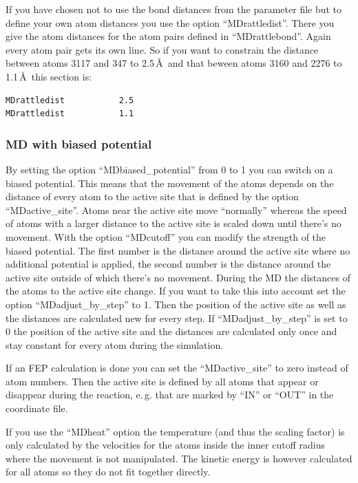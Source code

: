 \documentclass[10pt,a4paper]{article} %
\begin{document}
If you have chosen not to use the bond distances from the parameter file but to define your own atom distances you use the option ``MDrattledist''. There you give the atom distances for the atom pairs defined in ``MDrattlebond''. Again every atom pair gets its own line. So if you want to constrain the distance between atoms 3117 and 347 to 2.5\,\AA~and that beween atoms 3160 and 2276 to 1.1\,\AA~this section is:
\begin{lstlisting}
MDrattledist           2.5
MDrattledist           1.1
\end{lstlisting}
		
	\subsubsection{MD with biased potential}
	
	By setting the option ``MDbiased\_potential'' from 0 to 1 you can switch on a biased potential. This means that the movement of the atoms depends on the distance of every atom to the active site that is defined by the option ``MDactive\_site''. Atoms near the active site move ``normally'' whereas the speed of atoms with a larger distance to the active site is scaled down until there's no movement. With the option ``MDcutoff'' you can modify the strength of the biased potential. The first number is the distance around the active site where no additional potential is applied, the second number is the distance around the active site outside of which there's no movement. During the MD the distances of the atoms to the active site change. If you want to take this into account set the option ``MDadjust\_by\_step'' to 1. Then the position of the active site as well as the distances are calculated new for every step. If ``MDadjust\_by\_step'' is set to 0 the position of the active site and the distances are calculated only once and stay constant for every atom during the simulation. 
	
If an FEP calculation is done you can set the ``MDactive\_site'' to zero instead of atom numbers. Then the active site is defined by all atoms that appear or disappear during the reaction, e.\,g. that are marked by ``IN'' or ``OUT'' in the coordinate file. 
	
If you use the ``MDheat'' option the temperature (and thus the scaling factor) is only calculated by the velocities for the atoms inside the inner cutoff radius where the movement is not manipulated. The kinetic energy is however calculated for all atoms so they do not fit together directly. 
\end{document}
